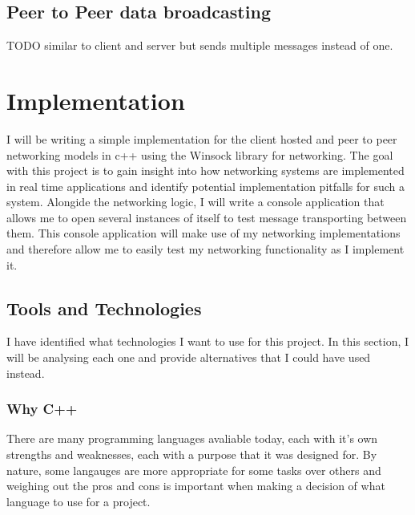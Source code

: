 \subsection{Peer to Peer data broadcasting}
TODO similar to client and server but sends multiple messages instead of one.


\newpage
\section{Implementation}
I will be writing a simple implementation for the client hosted and peer to peer networking models in c++ using the Winsock library for networking. The goal with this project is to gain insight into how networking systems are implemented in real time applications and identify potential implementation pitfalls for such a system. Alongide the networking logic, I will write a console application that allows me to open several instances of itself to test message transporting between them. This console application will make use of my networking implementations and therefore allow me to easily test my networking functionality as I implement it.

\subsection{Tools and Technologies}
I have identified what technologies I want to use for this project. In this section, I will be analysing each one and provide alternatives that I could have used instead.

\subsubsection{Why C++}
There are many programming languages avaliable today, each with it's own strengths and weaknesses, each with a purpose that it was designed for. By nature, some langauges are more appropriate for some tasks over others and weighing out the pros and cons is important when making a decision of what language to use for a project.


